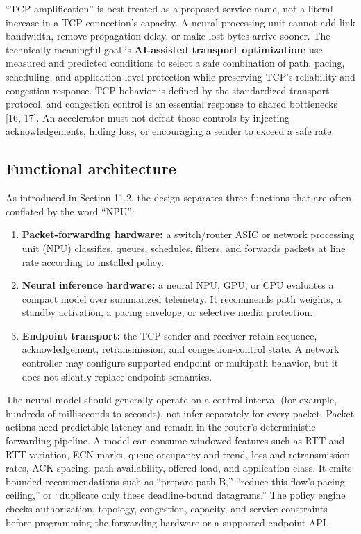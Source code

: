 \documentclass[
  american,
  11pt,
]{article}
\providecommand{\tightlist}{%
  \setlength{\itemsep}{0pt}\setlength{\parskip}{0pt}}
\begin{document}
``TCP amplification'' is best treated as a proposed service name, not a
literal increase in a TCP connection's capacity. A neural processing
unit cannot add link bandwidth, remove propagation delay, or make lost
bytes arrive sooner. The technically meaningful goal is
\textbf{AI-assisted transport optimization}: use measured and predicted
conditions to select a safe combination of path, pacing, scheduling, and
application-level protection while preserving TCP's reliability and
congestion response. TCP behavior is defined by the standardized
transport protocol, and congestion control is an essential response to
shared bottlenecks {[}16, 17{]}. An accelerator must not defeat those
controls by injecting acknowledgements, hiding loss, or encouraging a
sender to exceed a safe rate.

\subsection{Functional architecture}\label{functional-architecture}

As introduced in Section 11.2, the design separates three functions that
are often conflated by the word ``NPU'':

\begin{enumerate}
\def\labelenumi{\arabic{enumi}.}
\tightlist
\item
  \textbf{Packet-forwarding hardware:} a switch/router ASIC or network
  processing unit (NPU) classifies, queues, schedules, filters, and
  forwards packets at line rate according to installed policy.
\item
  \textbf{Neural inference hardware:} a neural NPU, GPU, or CPU
  evaluates a compact model over summarized telemetry. It recommends
  path weights, a standby activation, a pacing envelope, or selective
  media protection.
\item
  \textbf{Endpoint transport:} the TCP sender and receiver retain
  sequence, acknowledgement, retransmission, and congestion-control
  state. A network controller may configure supported endpoint or
  multipath behavior, but it does not silently replace endpoint
  semantics.
\end{enumerate}

The neural model should generally operate on a control interval (for
example, hundreds of milliseconds to seconds), not infer separately for
every packet. Packet actions need predictable latency and remain in the
router's deterministic forwarding pipeline. A model can consume windowed
features such as RTT and RTT variation, ECN marks, queue occupancy and
trend, loss and retransmission rates, ACK spacing, path availability,
offered load, and application class. It emits bounded recommendations
such as ``prepare path B,'' ``reduce this flow's pacing ceiling,'' or
``duplicate only these deadline-bound datagrams.'' The policy engine
checks authorization, topology, congestion, capacity, and service
constraints before programming the forwarding hardware or a supported
endpoint API.
\end{document}
